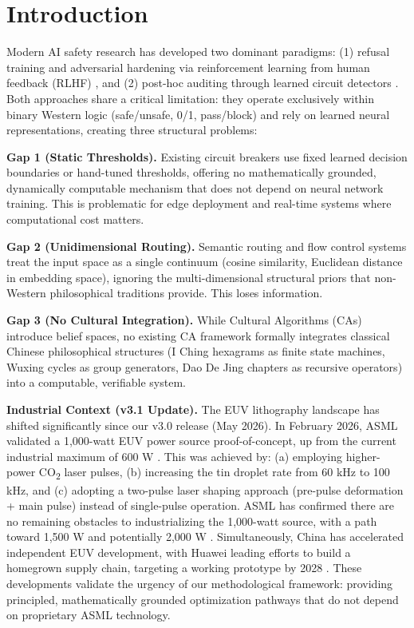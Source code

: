 \documentclass[twocolumn]{article}
\begin{document}
\section{Introduction}

Modern AI safety research has developed two dominant paradigms: (1) refusal training and adversarial hardening via reinforcement learning from human feedback (RLHF) \cite{Christiano2023,Ouyang2022}, and (2) post-hoc auditing through learned circuit detectors \cite{Zou2024}. Both approaches share a critical limitation: they operate exclusively within binary Western logic (safe/unsafe, 0/1, pass/block) and rely on learned neural representations, creating three structural problems:

\textbf{Gap 1 (Static Thresholds).} Existing circuit breakers use fixed learned decision boundaries or hand-tuned thresholds, offering no mathematically grounded, dynamically computable mechanism that does not depend on neural network training. This is problematic for edge deployment and real-time systems where computational cost matters.

\textbf{Gap 2 (Unidimensional Routing).} Semantic routing and flow control systems treat the input space as a single continuum (cosine similarity, Euclidean distance in embedding space), ignoring the multi-dimensional structural priors that non-Western philosophical traditions provide. This loses information.

\textbf{Gap 3 (No Cultural Integration).} While Cultural Algorithms (CAs) \cite{Reynolds1994,Reynolds2005} introduce belief spaces, no existing CA framework formally integrates classical Chinese philosophical structures (I Ching hexagrams as finite state machines, Wuxing cycles as group generators, Dao De Jing chapters as recursive operators) into a computable, verifiable system.

\textbf{Industrial Context (v3.1 Update).} The EUV lithography landscape has shifted significantly since our v3.0 release (May 2026). In February 2026, ASML validated a 1,000-watt EUV power source proof-of-concept, up from the current industrial maximum of 600 W \cite{ASML2026_1000W}. This was achieved by: (a) employing higher-power CO\textsubscript{2} laser pulses, (b) increasing the tin droplet rate from 60 kHz to 100 kHz, and (c) adopting a two-pulse laser shaping approach (pre-pulse deformation + main pulse) instead of single-pulse operation. ASML has confirmed there are no remaining obstacles to industrializing the 1,000-watt source, with a path toward 1,500 W and potentially 2,000 W \cite{TechPowerUp2026}. Simultaneously, China has accelerated independent EUV development, with Huawei leading efforts to build a homegrown supply chain, targeting a working prototype by 2028 \cite{TechPowerUp2026}. These developments validate the urgency of our methodological framework: providing principled, mathematically grounded optimization pathways that do not depend on proprietary ASML technology.
\end{document}
